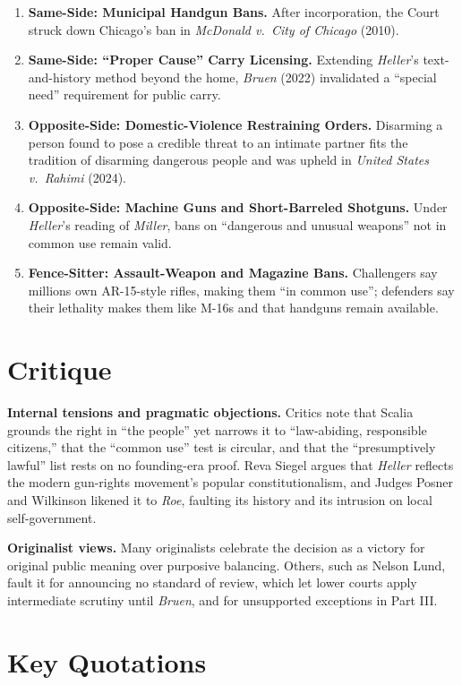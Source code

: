 \documentclass[12pt]{article}
\begin{document}
\begin{enumerate}
\item \textbf{Same-Side: Municipal Handgun Bans.} After incorporation, the Court struck down Chicago's ban in \textit{McDonald v.\ City of Chicago} (2010).
\item \textbf{Same-Side: ``Proper Cause'' Carry Licensing.} Extending \textit{Heller}'s text-and-history method beyond the home, \textit{Bruen} (2022) invalidated a ``special need'' requirement for public carry.
\item \textbf{Opposite-Side: Domestic-Violence Restraining Orders.} Disarming a person found to pose a credible threat to an intimate partner fits the tradition of disarming dangerous people and was upheld in \textit{United States v.\ Rahimi} (2024).
\item \textbf{Opposite-Side: Machine Guns and Short-Barreled Shotguns.} Under \textit{Heller}'s reading of \textit{Miller}, bans on ``dangerous and unusual weapons'' not in common use remain valid.
\item \textbf{Fence-Sitter: Assault-Weapon and Magazine Bans.} Challengers say millions own AR-15-style rifles, making them ``in common use''; defenders say their lethality makes them like M-16s and that handguns remain available.
\end{enumerate}

\section{Critique}

\textbf{Internal tensions and pragmatic objections.} Critics note that Scalia grounds the right in ``the people'' yet narrows it to ``law-abiding, responsible citizens,'' that the ``common use'' test is circular, and that the ``presumptively lawful'' list rests on no founding-era proof. Reva Siegel argues that \textit{Heller} reflects the modern gun-rights movement's popular constitutionalism, and Judges Posner and Wilkinson likened it to \textit{Roe}, faulting its history and its intrusion on local self-government.

\textbf{Originalist views.} Many originalists celebrate the decision as a victory for original public meaning over purposive balancing. Others, such as Nelson Lund, fault it for announcing no standard of review, which let lower courts apply intermediate scrutiny until \textit{Bruen}, and for unsupported exceptions in Part III.

\section{Key Quotations}
\end{document}
